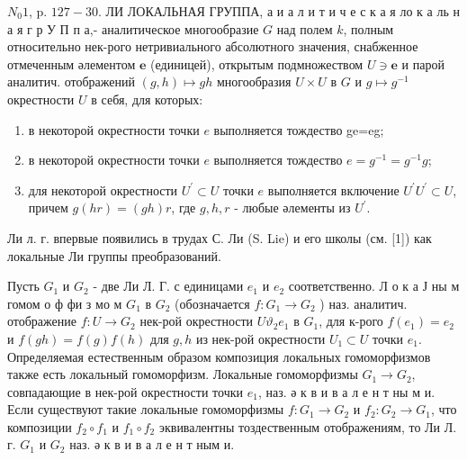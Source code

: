 \documentclass[10pt]{article}
\begin{document}
$N_{0} 1$, p. $127-30$. ЛИ ЛОКАЛЬНАЯ ГРУППА, а и а л и т и ч е с к а я ло к а ль н а я г р У П п а,- аналитическое многообразие $G$ над полем $k$, полным относительно нек-рого нетривиального абсолютного значения, снабженное отмеченным әлементом $\boldsymbol{e}$ (единицей), открытым подмножеством $U \ni \boldsymbol{e}$ и парой аналитич. отображений $(g, h) \longmapsto g h$ многообразия $U \times U$ в $G$ и $g \longmapsto g^{-1}$ окрестности $U$ в себя, для которых:



\begin{enumerate}

  \item в некоторой окрестности точки $e$ выполняется тождество ge=eg;



  \item в некоторой окрестности точки $e$ выполняется тождество $e=g^{-1}=g^{-1} g$;



  \item для некоторой окрестности $U^{\prime} \subset U$ точки $e$ выполняется включение $U^{\prime} U^{\prime} \subset U$, причем $g(h r)=(g h) r$, где $g, h, r$ - любые әлементы из $U^{\prime}$.



\end{enumerate}



Ли л. г. впервые появились в трудах С. Ли (S. Lie) и его школы (см. [1]) как локальные Ли группы преобразований.



Пусть $G_{1}$ и $G_{2}$ - две Ли Л. Г. с единицами $e_{1}$ и $e_{2}$ соответственно. Л о к а Ј ны м гомом о ф фи з мо м $G_{1}$ в $G_{2}$ (обозначается $f: G_{1} \rightarrow G_{2}$ ) наз. аналитич. отображение $f: U \rightarrow G_{2}$ нек-рой окрестности $U \vartheta_{2} e_{1}$ в $G_{1}$, для к-рого $f\left(e_{1}\right)=e_{2}$ и $f(g h)=f(g) f(h)$ для $g, h$ из нек-рой окрестности $U_{1} \subset U$ точки $e_{1}$. Определяемая естественным образом композиция локальных гомоморфизмов также есть локальный гомоморфизм. Локальные гомоморфизмы $G_{1} \rightarrow G_{2}$, совпадающие в нек-рой окрестности точки $e_{1}$, наз. ә к в и в а л е н т ны м и. Если существуют такие локальные гомоморфизмы $f: G_{1} \rightarrow G_{2}$ и $f_{2}: G_{2} \rightarrow G_{1}$, что композиции $f_{2} \circ f_{1}$ и $f_{1} \circ f_{2}$ эквивалентны тоздественным отображениям, то Ли Л. г. $G_{1}$ и $G_{2}$ наз. ә к в и в а л е н т ным и.
\end{document}
